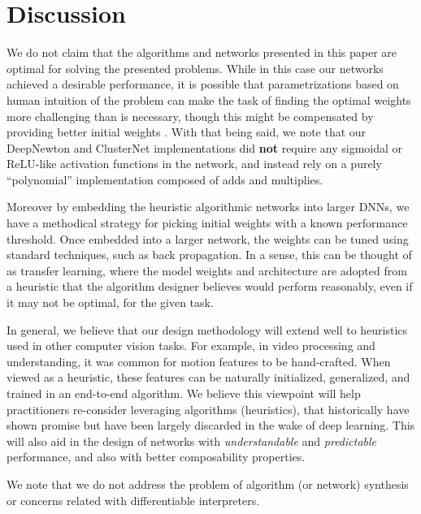 \documentclass{article}
\begin{document}
\section{Discussion}
We do not claim that the algorithms and networks presented in this paper are optimal for solving the presented problems.  While in this case our networks achieved a desirable performance, it is possible that parametrizations based on human intuition of the problem can make the task of finding the optimal weights more challenging than is necessary, though this might be compensated by providing better initial weights \cite{mishkin2015all}. With that being said, we note that our DeepNewton and ClusterNet implementations did \textbf{not} require any sigmoidal or ReLU-like activation functions in the network, and instead rely on a purely ``polynomial'' implementation composed of adds and multiplies.

Moreover by embedding the heuristic algorithmic networks into larger DNNs, we have a methodical strategy for picking initial weights with a known performance threshold. Once embedded into a larger network, the weights can be tuned using standard techniques, such as back propagation. In a sense, this can be thought of as transfer learning, where the model weights and architecture are adopted from a heuristic that the algorithm designer believes would perform reasonably, even if it may not be optimal, for the given task.

In general, we believe that our design methodology will extend well to heuristics used in other computer vision tasks. For example, in video processing and understanding, it was common for motion features to be hand-crafted. When viewed as a heuristic, these features can be naturally initialized, generalized, and trained in an end-to-end algorithm. We believe this viewpoint will help practitioners re-consider leveraging algorithms (heuristics), that historically have shown promise but have been largely discarded in the wake of deep learning. This will also aid in the design of networks with \textsl{understandable} and \textsl{predictable} performance, and also with better composability properties.

We note that we do not address the problem of algorithm (or network) synthesis or concerns related with differentiable interpreters.



















\small


\end{document}
